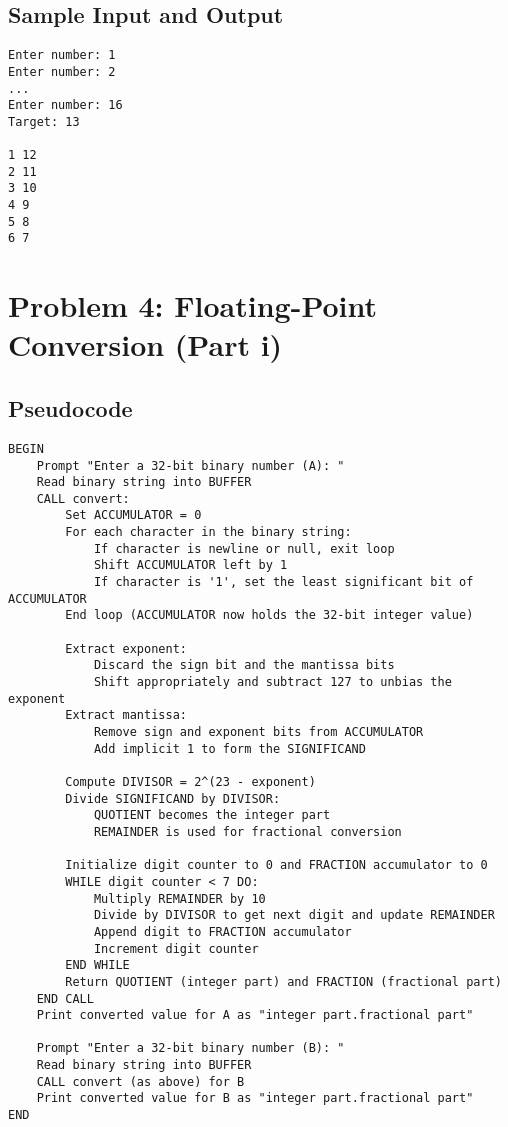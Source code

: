 \documentclass[a4paper]{article}
\begin{document}
\newpage
\subsection*{Sample Input and Output}
\begin{verbatim}
Enter number: 1
Enter number: 2
...
Enter number: 16
Target: 13

1 12
2 11
3 10
4 9
5 8
6 7
\end{verbatim}


\newpage

\section*{Problem 4: Floating-Point Conversion (Part i)}

\subsection*{Pseudocode}
\begin{verbatim}
BEGIN
    Prompt "Enter a 32-bit binary number (A): "
    Read binary string into BUFFER
    CALL convert:
        Set ACCUMULATOR = 0
        For each character in the binary string:
            If character is newline or null, exit loop
            Shift ACCUMULATOR left by 1
            If character is '1', set the least significant bit of ACCUMULATOR
        End loop (ACCUMULATOR now holds the 32-bit integer value)
        
        Extract exponent:
            Discard the sign bit and the mantissa bits
            Shift appropriately and subtract 127 to unbias the exponent
        Extract mantissa:
            Remove sign and exponent bits from ACCUMULATOR
            Add implicit 1 to form the SIGNIFICAND
        
        Compute DIVISOR = 2^(23 - exponent)
        Divide SIGNIFICAND by DIVISOR:
            QUOTIENT becomes the integer part
            REMAINDER is used for fractional conversion
            
        Initialize digit counter to 0 and FRACTION accumulator to 0
        WHILE digit counter < 7 DO:
            Multiply REMAINDER by 10
            Divide by DIVISOR to get next digit and update REMAINDER
            Append digit to FRACTION accumulator
            Increment digit counter
        END WHILE
        Return QUOTIENT (integer part) and FRACTION (fractional part)
    END CALL
    Print converted value for A as "integer part.fractional part"

    Prompt "Enter a 32-bit binary number (B): "
    Read binary string into BUFFER
    CALL convert (as above) for B
    Print converted value for B as "integer part.fractional part"
END
\end{verbatim}
\end{document}
